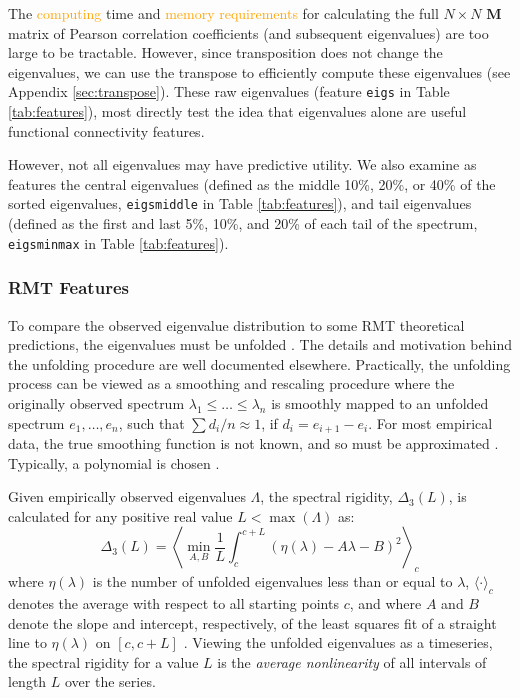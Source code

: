 \documentclass[12pt]{spieman}  %
\newcommand{\code}[1]{\small\texttt{#1}\normalsize}
\begin{document}
\begin{spacing}{2}
The \textcolor{orange}{computing} time and \textcolor{orange}{memory
requirements} for calculating the full \(N \times N\) \(\mathbf{M}\) matrix of
Pearson correlation coefficients (and subsequent eigenvalues) are too large to
be tractable. However, since transposition does not change the eigenvalues, we
can use the transpose to efficiently compute these eigenvalues (see Appendix
\ref{sec:transpose}). These raw eigenvalues (feature \code{eigs} in Table
\ref{tab:features}), most directly test the idea that eigenvalues alone are
useful functional connectivity features.

However, not all eigenvalues may have predictive utility. We also examine as
features the central eigenvalues (defined as the middle 10\%, 20\%, or 40\% of
the sorted eigenvalues, \code{eigsmiddle} in Table \ref{tab:features}), and
tail eigenvalues (defined as the first and last 5\%,  10\%, and 20\% of each
tail of the spectrum, \code{eigsminmax} in Table \ref{tab:features}).


\subsubsection{RMT Features}
\label{sec:rmt-features}


To compare the observed eigenvalue distribution to some RMT theoretical
predictions, the eigenvalues must be unfolded
\cite{guhrRandommatrixTheoriesQuantum1998a,mehtaRandomMatrices2004}. The
details and motivation behind the unfolding procedure are well documented
elsewhere\cite{guhrRandommatrixTheoriesQuantum1998a}. Practically, the
unfolding process can be viewed as a smoothing and rescaling procedure where
the originally observed spectrum \(\lambda_1 \le \dots \le \lambda_n\) is
smoothly mapped to an unfolded spectrum \(e_1, \dots, e_n\), such that \(\sum
d_i/n \approx 1\), if \(d_i = e_{i+1} - e_i \). For most empirical data, the
true smoothing function is not known, and so must be approximated
\cite{guhrRandommatrixTheoriesQuantum1998a,mehtaRandomMatrices2004}. Typically,
a polynomial is chosen \cite{abul-magdUnfoldingSpectrumChaotic2014}.

Given empirically observed eigenvalues \(\Lambda\), the spectral rigidity,
\(\Delta_3(L)\), is calculated for any positive real value \(L <
\max(\Lambda)\) as:
\begin{equation}
\label{eq:rigidity}
\Delta_3(L) = \left \langle \min_{A,B} \frac{1}{L} \int_c^{c+L} \left(  \eta(\lambda) -A \lambda - B \right)^2 \right \rangle_c
\end{equation}
where \(\eta(\lambda)\) is the number of unfolded eigenvalues less than or
equal to \(\lambda\), \(\langle \cdot \rangle_c\) denotes the average with
respect to all starting points \(c\), and where \(A\) and \(B\) denote the
slope and intercept, respectively, of the least squares fit of a straight line
to \(\eta(\lambda)\) on \([c, c+L]\)
\cite{guhrRandommatrixTheoriesQuantum1998a}. Viewing the unfolded eigenvalues
as a timeseries, the spectral rigidity for a value \(L\) is the
\textit{average nonlinearity} of all intervals of length \(L\) over the series.



\end{spacing}
\end{document}
